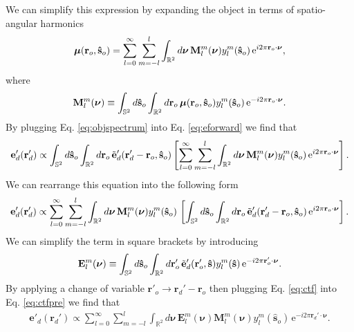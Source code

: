 \documentclass[11pt]{article}
\newcommand{\me}{\mathrm{e}}
\providecommand{\mb}[1]{\mathbf{#1}}
\providecommand{\ro}[1]{\mathbf{\mathbf{r}}_o}
\providecommand{\so}[1]{\mathbf{\hat{s}}_o}
\providecommand{\rd}[1]{\mathbf{r}_d}
\providecommand{\mh}[1]{\mathbf{\hat{#1}}}
\providecommand{\bs}[1]{\boldsymbol{#1}}
\begin{document}
We can simplify this expression by expanding the object in terms of spatio-angular
harmonics
\begin{align}
  \bs{\mu}(\ro{}, \so{}) = \sum_{l=0}^{\infty} \sum_{m=-l}^l \int_{\mathbb{R}^2}d\bs{\nu}{}\, \mb{M}_l^m(\bs{\nu})y_l^m(\so{})\thinspace\me^{i 2\pi \ro{}\cdot\bs{\nu}},
\end{align}
where
\begin{align}
\mb{M}_l^m(\bs{\nu}) \equiv \int_{\mathbb{S}^2}d\so{}\int_{\mathbb{R}^2}d\ro{} \, \bs{\mu}(\mb{r}_o, \so{}) y_l^m(\so{})\thinspace\me^{-i 2\pi \ro{}\cdot\bs{\nu}}. \label{eq:objspectrum}
\end{align}
By plugging Eq. \ref{eq:objspectrum} into Eq. \ref{eq:eforward} we find that 
\begin{align}
  \mb{e}'_d(\rd{}')  \propto \int_{\mathbb{S}^2}d\so{}\int_{\mathbb{R}^2}d\ro{}\,  \tilde{\mb{e}}'_d(\rd{}' - \mb{r}_o, \so{})\left[\sum_{l=0}^{\infty} \sum_{m=-l}^l \int_{\mathbb{R}^2}d\bs{\nu}{}\, \mb{M}_l^m(\bs{\nu})y_l^m(\so{})\thinspace\me^{i 2\pi \ro{}\cdot\bs{\nu}}\right].
\end{align}
We can rearrange this equation into the following form
\begin{align}
    \mb{e}'_d(\rd{}') \propto \sum_{l=0}^{\infty} \sum_{m=-l}^l \int_{\mathbb{R}^2}d\bs{\nu}{}\, \mb{M}_l^m(\bs{\nu})y_l^m(\so{})\thinspace\left[\int_{\mathbb{S}^2}d\so{}\int_{\mathbb{R}^2}d\ro{}\,  \tilde{\mb{e}}'_d(\rd{}' - \mb{r}_o, \so{})\, \me^{i 2\pi \ro{}\cdot\bs{\nu}}\right].\label{eq:ctfpre}
\end{align}
We can simplify the term in square brackets by introducing 
\begin{align}
  \mb{E}_l^m(\bs{\nu}) \equiv \int_{\mathbb{S}^2}d\so{}\int_{\mathbb{R}^2}d\ro{}'\, \tilde{\mb{e}}'_d(\ro{}', \mh{s}) y_l^m(\mh{s})\thinspace\me^{-i 2\pi \ro{}'\cdot\bs{\nu}}. \label{eq:ctf}
\end{align}
By applying a change of variable $\mb{r}'_o \rightarrow \rd{}' - \ro{}$ then plugging Eq.
\ref{eq:ctf} into Eq. \ref{eq:ctfpre} we find that 
\begin{align}
    \mb{e}'_d(\rd{}') \propto \sum_{l=0}^{\infty} \sum_{m=-l}^l \int_{\mathbb{R}^2}d\bs{\nu}{}\, \mb{E}_l^m(\bs{\nu})\mb{M}_l^m(\bs{\nu})y_l^m(\so{})\, \me^{-i 2\pi \rd{}'\cdot\bs{\nu}}.\label{eq:forwardelec}
\end{align}
\end{document}
